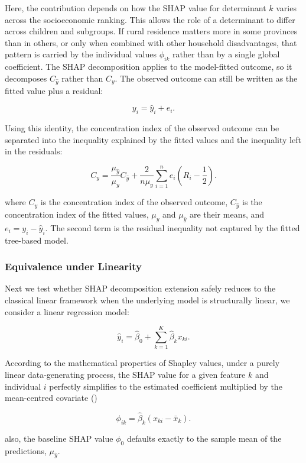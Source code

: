 \documentclass[
  11pt,
  a4paper,
]{article}
\begin{document}
Here, the contribution depends on how the SHAP value for determinant
\(k\) varies across the socioeconomic ranking. This allows the role of a
determinant to differ across children and subgroups. If rural residence
matters more in some provinces than in others, or only when combined
with other household disadvantages, that pattern is carried by the
individual values \(\phi_{ik}\) rather than by a single global
coefficient. The SHAP decomposition applies to the model-fitted outcome,
so it decomposes \(C_{\hat{y}}\) rather than \(C_y\). The observed
outcome can still be written as the fitted value plus a residual:

\[
y_i = \hat{y}_i + e_i.
\]

Using this identity, the concentration index of the observed outcome can
be separated into the inequality explained by the fitted values and the
inequality left in the residuals:

\[
C_y
=
\frac{\mu_{\hat{y}}}{\mu_y} C_{\hat{y}}
+
\frac{2}{n\mu_y}
\sum_{i=1}^n
e_i
\left(R_i - \frac{1}{2}\right).
\]

where \(C_y\) is the concentration index of the observed outcome,
\(C_{\hat{y}}\) is the concentration index of the fitted values,
\(\mu_y\) and \(\mu_{\hat{y}}\) are their means, and
\(e_i = y_i - \hat{y}_i\). The second term is the residual inequality
not captured by the fitted tree-based model.

\subsubsection{Equivalence under
Linearity}\label{sec-equivalence-linearity}

Next we test whether SHAP decomposition extension safely reduces to the
classical linear framework when the underlying model is structurally
linear, we consider a linear regression model:

\[
\hat{y}_i = \hat{\beta}_0 + \sum_{k=1}^K \hat{\beta}_k x_{ki}.
\]

According to the mathematical properties of Shapley values, under a
purely linear data-generating process, the SHAP value for a given
feature \(k\) and individual \(i\) perfectly simplifies to the estimated
coefficient multiplied by the mean-centred covariate
()

\[
\phi_{ik} = \hat{\beta}_k (x_{ki} - \bar{x}_k).
\]

also, the baseline SHAP value \(\phi_0\) defaults exactly to the sample
mean of the predictions, \(\mu_{\hat{y}}\).
\end{document}

